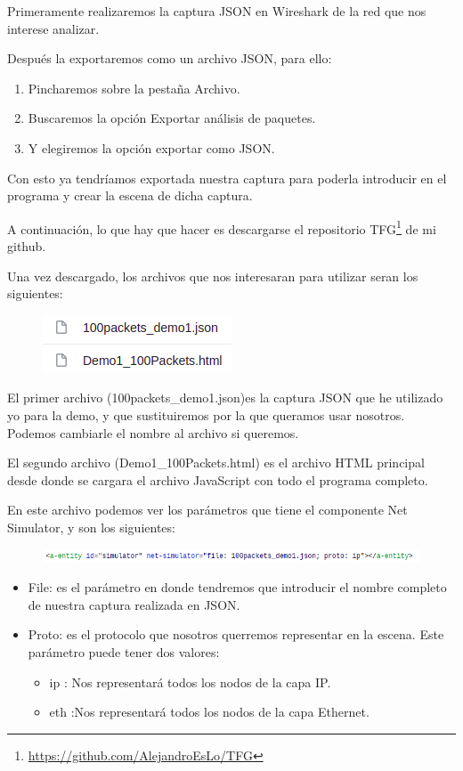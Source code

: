 \documentclass[a4paper, 12pt]{book}
\begin{document}
Primeramente realizaremos la captura JSON en Wireshark de la red que nos interese analizar.

Después la exportaremos como un archivo JSON, para ello:
\begin{enumerate}
    \item Pincharemos sobre la pestaña Archivo.
    \item Buscaremos la opción Exportar análisis de paquetes.
    \item Y elegiremos la opción exportar como JSON.
\end{enumerate}
Con esto ya tendríamos exportada nuestra captura para poderla introducir en el programa y crear la escena de dicha captura.

A continuación, lo que hay que hacer es descargarse el repositorio TFG\footnote{\url{https://github.com/AlejandroEsLo/TFG}} de mi github.

Una vez descargado, los archivos que nos interesaran para utilizar seran los siguientes:
\begin{figure}[h]
\centering
    \includegraphics[scale=0.8]{img/archivos.png}
\end{figure}

El primer archivo (100packets\_demo1.json)es la captura JSON que he utilizado yo para la demo, y que sustituiremos por la que queramos usar nosotros. Podemos cambiarle el nombre al archivo si queremos.

El segundo archivo (Demo1\_100Packets.html) es el archivo HTML principal desde donde se cargara el archivo JavaScript con todo el programa completo.


En este archivo podemos ver los parámetros que tiene el componente Net Simulator, y son los siguientes:

\begin{figure}[h]
\centering
    \includegraphics[scale=0.7]{img/parametros.png}
\end{figure}

\begin{itemize}
    \item File: es el parámetro en donde tendremos que introducir el nombre completo de nuestra captura realizada en JSON.
    \item Proto: es el protocolo que nosotros querremos representar en la escena. Este parámetro puede tener dos valores:
    \begin{itemize}
    \item ip : Nos representará todos los nodos de la capa IP.
    \item eth :Nos representará todos los nodos de la capa Ethernet.
    \end{itemize}
\end{itemize}
\end{document}

